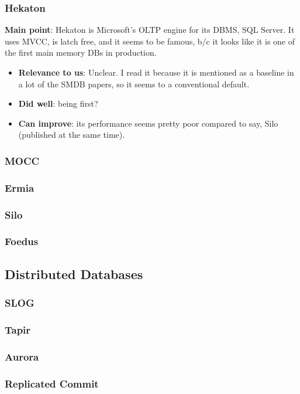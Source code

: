 \subsubsection{Hekaton}
\textbf{Main point}: Hekaton\cite{hekaton} is Microsoft's OLTP engine for its DBMS, SQL Server. It uses MVCC, is latch free, and it seems to be famous, b/c it looks like it is one of the first main memory DBs in production.
\begin{itemize}
    \item \textbf{Relevance to us}: Unclear. I read it because it is mentioned as a baseline in a lot of the SMDB papers, so it seems to a conventional default.
    \item \textbf{Did well}: being first?
    \item \textbf{Can improve}: its performance seems pretty poor compared to say, Silo (published at the same time).
\end{itemize}

\subsubsection{MOCC\cite{mocc}}

\subsubsection{Ermia\cite{ermia}}
\subsubsection{Silo\cite{silo}}
\subsubsection{Foedus}
\cite{foedus}

\subsection{Distributed Databases}
\subsubsection{SLOG\cite{slog}}
\subsubsection{Tapir\cite{tapir}}
\subsubsection{Aurora}
\cite{aurora}
\subsubsection{Replicated Commit}
\cite{replicatedcommit}